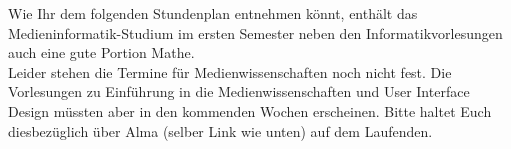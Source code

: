 
Wie Ihr dem folgenden Stundenplan entnehmen könnt, enthält das Medieninformatik-Studium im ersten
Semester neben den Informatikvorlesungen auch eine gute Portion Mathe.\\ %
Leider stehen die Termine für Medienwissenschaften noch nicht fest. Die Vorlesungen zu Einführung in die Medienwissenschaften und User Interface Design müssten aber in den kommenden Wochen erscheinen. Bitte haltet Euch diesbezüglich über Alma (selber Link wie unten) auf dem Laufenden.\\
\noindent{}

